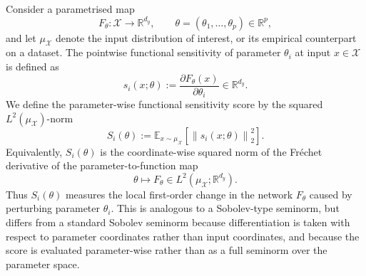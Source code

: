 \documentclass{article}
\theoremstyle{definition}
\theoremstyle{remark}
\begin{document}
Consider a parametrised map
\[
    F_\theta:\mathcal X\to\mathbb R^{d_y},
    \qquad
    \theta=(\theta_1,\ldots,\theta_p)\in\mathbb R^p,
\]
and let \(\mu_{\mathcal X}\) denote the input distribution of interest, or its empirical counterpart on a dataset. The pointwise functional sensitivity of parameter \(\theta_i\) at input \(x\in\mathcal X\) is defined as
\begin{equation}
    s_i(x;\theta)
    :=
    \frac{\partial F_\theta(x)}{\partial \theta_i}
    \in \mathbb R^{d_y}.
\end{equation}
We define the parameter-wise functional sensitivity score by the squared \(L^2(\mu_{\mathcal X})\)-norm
\begin{equation}
    S_i(\theta)
    :=
    \mathbb E_{x\sim\mu_{\mathcal X}}
    \left[
        \left\|s_i(x;\theta)\right\|_2^2
    \right].
    \label{eq:functional-sensitivity-score}
\end{equation}
Equivalently, \(S_i(\theta)\) is the coordinate-wise squared norm of the Fréchet derivative of the parameter-to-function map
\begin{equation}
    \theta \mapsto F_\theta
    \in L^2(\mu_{\mathcal X};\mathbb R^{d_y}).
\end{equation}
Thus \(S_i(\theta)\) measures the local first-order change in the network $F_\theta$ caused by perturbing parameter \(\theta_i\). This is analogous to a Sobolev-type seminorm, but differs from a standard Sobolev seminorm because differentiation is taken with respect to parameter coordinates rather than input coordinates, and because the score is evaluated parameter-wise rather than as a full seminorm over the parameter space.
\end{document}
